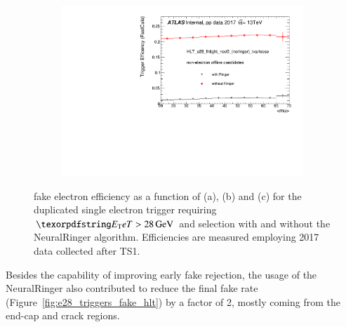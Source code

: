 \begin{figure}[h!tb]
\begin{center}
  \begin{subfigure}[c]{.48\textwidth}
  \centering
  \includegraphics[width=\textwidth]{sections/operation/figures/efficiencies/eff_EGAM7_e28_ringer_and_noringer_2017_after_ts1_L2Calo_mu.pdf}
  \caption{}
  \end{subfigure}
  \caption{\label{fig:e28_triggers_fake} \fastcalo %
  fake electron efficiency as a function of \et (a), \eta (b) and \avgmu (c) for the
  duplicated single electron trigger requiring $\et > \SI{28}{\GeV}$ and \tight
  selection with and without the NeuralRinger algorithm. Efficiencies are measured
  employing 2017 data collected after TS1.}%
  
  \end{center}
\end{figure}





Besides the capability of improving early fake rejection, the usage of the
NeuralRinger also contributed to reduce the final fake rate
(Figure~\ref{fig:e28_triggers_fake_hlt}) by a factor of 2, mostly coming from
the end-cap and crack regions. %

